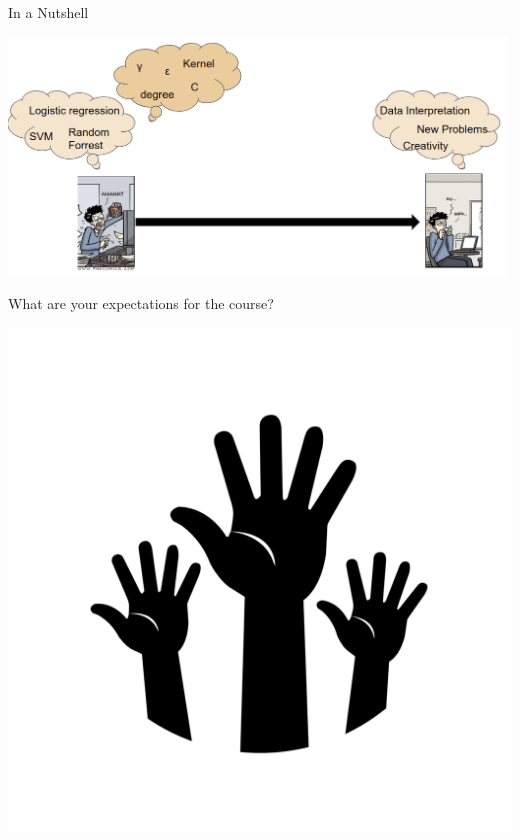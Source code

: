 \begin{frame}[c]{In a Nutshell}

\includegraphics[width=0.99\textwidth]{images/automl_comic}

\end{frame}
\begin{frame}[c]{}

\huge
\centering
What are your expectations for the course?

\bigskip

\includegraphics[scale=0.1]{images/hands.png}

\end{frame}
